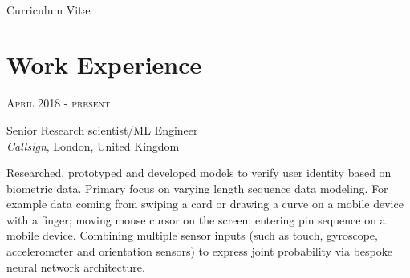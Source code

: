 \documentclass[10pt]{article} %
\begin{document}
\color{text1} %


\par{\\ %
{\color{headings} Curriculum {Vit\ae}\\[15pt]\par} %


\begin{minipage}[t]{0.5\textwidth} %
\vspace{0pt} %


\section{Work Experience}


\vspace{0.5cm}
{\raggedleft\textsc{April 2018 - present}\par}

{\raggedright\large Senior Research scientist/ML Engineer\\
\textit{Callsign}, London, United Kingdom\\[5pt]}

\normalsize{
Researched, prototyped and developed models to verify user 
identity based on biometric data. Primary focus on varying 
length sequence data modeling. For example data coming from 
swiping a card or drawing a curve on a mobile device with 
a finger; moving mouse cursor on the screen; entering pin 
sequence on a mobile device. Combining multiple sensor inputs 
(such as touch, gyroscope, accelerometer and orientation sensors)
to express joint probability via bespoke neural network architecture.
\\

}
\end{minipage}}
\end{document}
